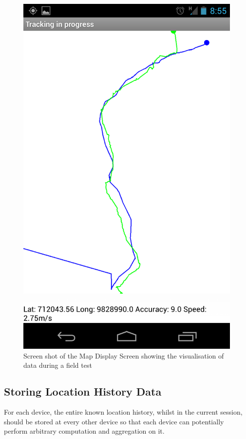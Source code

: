 \begin{figure}[h]
\centering
\includegraphics[scale=0.15]{realUsage}
\caption{Screen shot of the Map Display Screen showing the visualisation of data during a field test}
\label{fig:mapScreen}
\end{figure}

\subsection{Storing Location History Data}

For each device, the entire known location history, whilst in the current session, should be stored at every other device so that each device can potentially perform arbitrary computation and aggregation on it.

